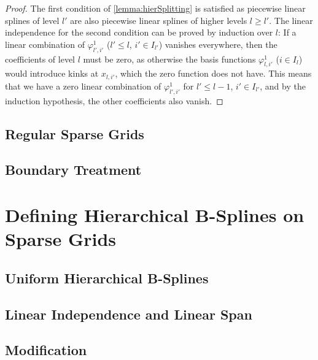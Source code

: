 \begin{proof}
  The first condition of \cref{lemma:hierSplitting}
  is satisfied as piecewise linear splines of level $l'$
  are also piecewise linear splines of higher levels $l \ge l'$.
  The linear independence for the second condition can be proved by induction
  over $l$:
  If a linear combination of $\varphi_{l',i'}^1$ ($l' \le l$, $i' \in I_{l'}$)
  vanishes everywhere, then the coefficients of level $l$ must be zero,
  as otherwise the basis functions $\varphi_{l,i'}^1$ ($i \in I_l$) would
  introduce kinks at $x_{l,i'}$, which the zero function does not have.
  This means that we have a zero linear combination of $\varphi_{l',i'}^1$ for
  $l' \le l - 1$, $i' \in I_{l'}$,
  and by the induction hypothesis, the other coefficients also vanish.
\end{proof}


\subsection{Regular Sparse Grids}


\subsection{Boundary Treatment}


\section{Defining Hierarchical B-Splines on Sparse Grids}
\label{sec:sgBspl}


\subsection{Uniform Hierarchical B-Splines}


\subsection{Linear Independence and Linear Span}


\subsection{Modification}

